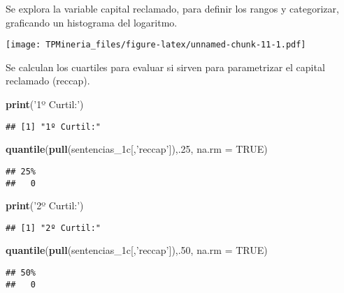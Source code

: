 \documentclass[runningheads,a4paper]{llncs}
\newenvironment{Shaded}{\footnotesize}{}
\newcommand{\KeywordTok}[1]{\textcolor[rgb]{0.00,0.44,0.13}{\textbf{{#1}}}}
\newcommand{\DataTypeTok}[1]{\textcolor[rgb]{0.56,0.13,0.00}{{#1}}}
\newcommand{\DecValTok}[1]{\textcolor[rgb]{0.25,0.63,0.44}{{#1}}}
\newcommand{\StringTok}[1]{\textcolor[rgb]{0.25,0.44,0.63}{{#1}}}
\newcommand{\OtherTok}[1]{\textcolor[rgb]{0.00,0.44,0.13}{{#1}}}
\newcommand{\NormalTok}[1]{{#1}}
\begin{document}
Se explora la variable capital reclamado, para definir los rangos y
categorizar, graficando un histograma del logaritmo.

\texttt{[image: TPMineria\_files/figure-latex/unnamed-chunk-11-1.pdf]}

Se calculan los cuartiles para evaluar si sirven para parametrizar el
capital reclamado (reccap).

\begin{Shaded}
\begin{Highlighting}[]
\KeywordTok{print}\NormalTok{(}\StringTok{'1º Curtil:'}\NormalTok{)}
\end{Highlighting}
\end{Shaded}

\begin{verbatim}
## [1] "1º Curtil:"
\end{verbatim}

\begin{Shaded}
\begin{Highlighting}[]
\KeywordTok{quantile}\NormalTok{(}\KeywordTok{pull}\NormalTok{(sentencias_1c[,}\StringTok{'reccap'}\NormalTok{]),.}\DecValTok{25}\NormalTok{, }\DataTypeTok{na.rm =} \OtherTok{TRUE}\NormalTok{)}
\end{Highlighting}
\end{Shaded}

\begin{verbatim}
## 25% 
##   0
\end{verbatim}

\begin{Shaded}
\begin{Highlighting}[]
\KeywordTok{print}\NormalTok{(}\StringTok{'2º Curtil:'}\NormalTok{)}
\end{Highlighting}
\end{Shaded}

\begin{verbatim}
## [1] "2º Curtil:"
\end{verbatim}

\begin{Shaded}
\begin{Highlighting}[]
\KeywordTok{quantile}\NormalTok{(}\KeywordTok{pull}\NormalTok{(sentencias_1c[,}\StringTok{'reccap'}\NormalTok{]),.}\DecValTok{50}\NormalTok{, }\DataTypeTok{na.rm =} \OtherTok{TRUE}\NormalTok{)}
\end{Highlighting}
\end{Shaded}

\begin{verbatim}
## 50% 
##   0
\end{verbatim}
\end{document}
